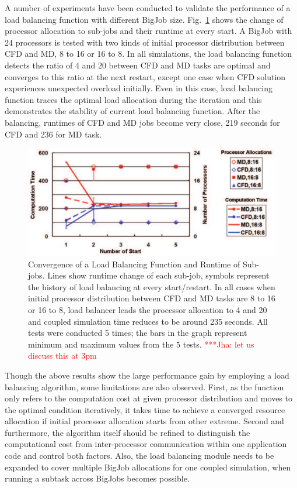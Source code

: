 \documentclass[conference,final]{IEEEtran}
\newcommand{\jhanote}[1]{ {\textcolor{red} { ***Jha: #1 }}}
\newcommand{\jhanote}[1]{}
\begin{document}
A number of experiments have been conducted to validate the performance of a load balancing function with different BigJob size. Fig.~\ref{fig:LB_Graph} shows the change of processor allocation to sub-jobs and their runtime at every start. A BigJob with 24 processors is tested with two kinds of initial processor distribution between CFD and MD, 8 to 16 or 16 to 8. In all simulations, the load balancing function detects the ratio of 4 and 20 between CFD and MD tasks are optimal and converges to this ratio at the next restart, except one case when CFD solution experiences unexpected overload initially. Even in this case, load balancing function traces the optimal load allocation during the iteration and this demonstrates the stability of current load balancing function. After the balancing, runtimes of CFD and MD jobs become very close, 219 seconds for CFD and 236 for MD task.

\begin{figure}
\centering
\includegraphics[scale=0.35]{LB_Graph}
\caption{\small Convergence of a Load Balancing Function and Runtime of Sub-jobs. Lines show runtime change of each sub-job, symbols represent the history of load balancing at every start/restart. In all cases when initial processor distribution between CFD and MD tasks are 8 to 16 or 16 to 8, load balancer leads the processor allocation to 4 and 20 and coupled simulation time reduces to be around 235 seconds. All tests were conducted 5 times; the bars in the graph represent minimum and maximum values from the 5 tests. \jhanote{let us discuss this at 3pm}}
\label{fig:LB_Graph}
\end{figure}


Though the above results show the large performance gain by employing a load balancing algorithm, some limitations are also observed. First, as the function only refers to the computation cost at given processor distribution and moves to the optimal condition iteratively, it takes time to achieve a converged resource allocation if initial processor allocation starts from other extreme. Second and furthermore, the algorithm itself should be refined to distinguish the computational cost from inter-processor communication within one application code and control both factors. Also, the load balancing module needs to be expanded to cover multiple BigJob allocations for one coupled simulation, when running a subtask across BigJobs becomes possible.
\end{document}
